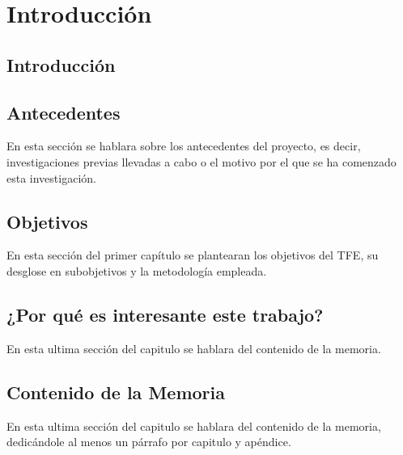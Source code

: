 
\chapter{Introducción}

\thispagestyle{plain}
\renewcommand{\tablename}{Tabla}

\section{Introducción}

\section{Antecedentes}
En esta sección se hablara sobre los antecedentes del proyecto, es decir, investigaciones previas llevadas a cabo o el motivo por el que se ha comenzado esta investigación.

\section{Objetivos}
En esta sección del primer capítulo se plantearan los objetivos del TFE, su desglose en subobjetivos y la metodología empleada.

\section{¿Por qué es interesante este trabajo?}
En esta ultima sección del capitulo se hablara del contenido de la memoria.

\section{Contenido de la Memoria}

En esta ultima sección del capitulo se hablara del contenido de la memoria, dedicándole al menos un párrafo por capitulo y apéndice.

\blankpage